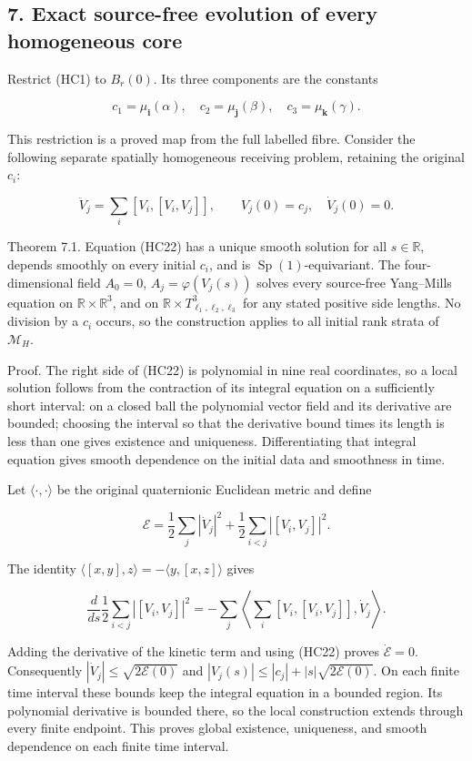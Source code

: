 \documentclass[11pt]{article}
\begin{document}
\subsection*{7. Exact source-free evolution of every homogeneous core}

Restrict (HC1) to \(B_r(0)\). Its three components are the constants

\[
 c_1=\mu_{\mathbf i}(\alpha),\quad
 c_2=\mu_{\mathbf j}(\beta),\quad
 c_3=\mu_{\mathbf k}(\gamma).
 \tag{HC21}
\]

This restriction is a proved map from the full labelled fibre. Consider
the following separate spatially homogeneous receiving problem, retaining
the original \(c_i\):

\[
 \ddot V_j=\sum_i[V_i,[V_i,V_j]],\qquad
 V_j(0)=c_j,\quad\dot V_j(0)=0.
 \tag{HC22}
\]

Theorem 7.1. Equation (HC22) has a unique smooth solution for all
\(s\in\mathbb R\), depends smoothly on every initial \(c_i\), and is
\(\operatorname{Sp}(1)\)-equivariant. The four-dimensional field
\(A_0=0\), \(A_j=\varphi(V_j(s))\) solves every source-free Yang–Mills
equation on \(\mathbb R\times\mathbb R^3\), and on
\(\mathbb R\times T^3_{\ell_1,\ell_2,\ell_3}\) for any stated positive
side lengths. No division by a \(c_i\) occurs, so the construction applies
to all initial rank strata of \(\mathcal M_H\).

Proof. The right side of (HC22) is polynomial in nine real coordinates,
so a local solution follows from the contraction of its integral equation
on a sufficiently short interval: on a closed ball the polynomial vector
field and its derivative are bounded; choosing the interval so that the
derivative bound times its length is less than one gives existence and
uniqueness. Differentiating that integral equation gives smooth dependence
on the initial data and smoothness in time.

Let \(\langle\cdot,\cdot\rangle\) be the original quaternionic Euclidean
metric and define

\[
 \mathcal E=\frac12\sum_j|\dot V_j|^2
       +\frac12\sum_{i<j}|[V_i,V_j]|^2.
 \tag{HC23}
\]

The identity \(\langle[x,y],z\rangle=-\langle y,[x,z]\rangle\) gives

\[
 \frac{d}{ds}\frac12\sum_{i<j}|[V_i,V_j]|^2
 =-\sum_j\left\langle
       \sum_i[V_i,[V_i,V_j]],\dot V_j\right\rangle.
\]

Adding the derivative of the kinetic term and using (HC22) proves
\(\dot{\mathcal E}=0\). Consequently
\(|\dot V_j|\le\sqrt{2\mathcal E(0)}\) and
\(|V_j(s)|\le|c_j|+|s|\sqrt{2\mathcal E(0)}\).
On each finite time interval these bounds keep the integral equation in
a bounded region. Its polynomial derivative is bounded there, so the
local construction extends through every finite endpoint. This proves
global existence, uniqueness, and smooth dependence on each finite
time interval.
\end{document}
